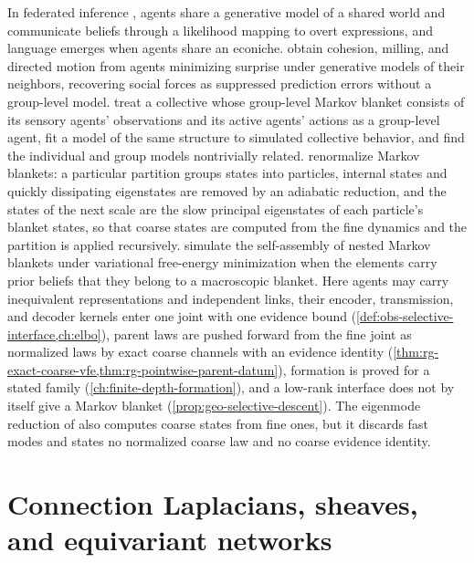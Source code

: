 In federated inference \citep{friston2024federated}, agents share a generative
model of a shared world and communicate beliefs through a likelihood mapping to
overt expressions, and language emerges when agents share an econiche.
\citet{heins2024collective} obtain cohesion, milling, and directed motion from
agents minimizing surprise under generative models of their neighbors,
recovering social forces as suppressed prediction errors without a group-level
model. \citet{waade2025asone} treat a collective whose group-level Markov
blanket consists of its sensory agents' observations and its active agents'
actions as a group-level agent, fit a model of the same structure to simulated
collective behavior, and find the individual and group models nontrivially
related. \citet{Friston2021Parcels} renormalize Markov blankets: a particular
partition groups states into particles, internal states and quickly dissipating
eigenstates are removed by an adiabatic reduction, and the states of the next
scale are the slow principal eigenstates of each particle's blanket states, so
that coarse states are computed from the fine dynamics and the partition is
applied recursively. \citet{Palacios2020Hierarchical} simulate the
self-assembly of nested Markov blankets under variational free-energy
minimization when the elements carry prior beliefs that they belong to a
macroscopic blanket. Here agents may carry inequivalent representations and independent
links, their encoder, transmission, and decoder kernels enter one joint with one
evidence bound (\cref{def:obs-selective-interface,ch:elbo}), parent laws are
pushed forward from the fine joint as normalized laws by exact coarse channels
with an evidence identity
(\cref{thm:rg-exact-coarse-vfe,thm:rg-pointwise-parent-datum}), formation is
proved for a stated family (\cref{ch:finite-depth-formation}), and a low-rank
interface does not by itself give a Markov blanket
(\cref{prop:geo-selective-descent}). The eigenmode reduction of
\citet{Friston2021Parcels} also computes coarse states from fine ones, but it
discards fast modes and states no normalized coarse law and no coarse evidence
identity.

\section{Connection Laplacians, sheaves, and equivariant networks}

